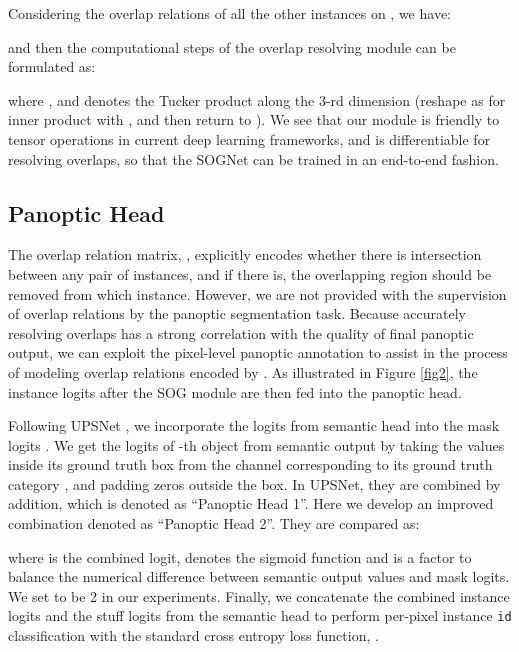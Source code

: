 \documentclass[letterpaper]{article} \usepackage{aaai20}  \usepackage{times}  \usepackage{helvet} \usepackage{courier}  \usepackage[hyphens]{url}  \usepackage{graphicx} \urlstyle{rm} \def\UrlFont{\rm}  \usepackage{graphicx}  \frenchspacing  \setlength{\pdfpagewidth}{8.5in}  \setlength{\pdfpageheight}{11in}
\begin{document}
Considering the overlap relations of all the other instances on , we have:

and then the computational steps of the overlap resolving module can be formulated as:

where , and  denotes the Tucker product along the 3-rd dimension (reshape  as  for inner product with , and then return to ). We see that our module is friendly to tensor operations in current deep learning frameworks, and is differentiable for resolving overlaps, so that the SOGNet can be trained in an end-to-end fashion. 






\subsection{Panoptic Head}



The overlap relation matrix, , explicitly encodes whether there is intersection between any pair of instances, and if there is, the overlapping region should be removed from which instance. However, we are not provided with the supervision of overlap relations by the panoptic segmentation task. Because accurately resolving overlaps has a strong correlation with the quality of final panoptic output, we can exploit the pixel-level panoptic annotation to assist in the process of modeling overlap relations encoded by . As illustrated in Figure \ref{fig2}, the instance logits  after the SOG module are then fed into the panoptic head. 

Following UPSNet \cite{xiong2019upsnet}, we incorporate the logits from semantic head into the mask logits . We get the logits of -th object from semantic output  by taking the values inside its ground truth box  from the channel corresponding to its ground truth category , and padding zeros outside the box. In UPSNet, they are combined by addition, which is denoted as ``Panoptic Head 1''. Here we develop an improved combination denoted as ``Panoptic Head 2''. They are compared as:

where  is the combined logit,  denotes the sigmoid function and  is a factor to balance the numerical difference between semantic output values and mask logits. We set  to be 2 in our experiments. Finally, we concatenate the combined instance logits  and the stuff logits  from the semantic head to perform per-pixel instance \verb|id| classification with the standard cross entropy loss function, .
\end{document}
